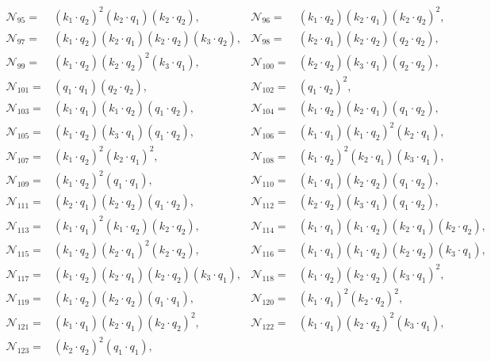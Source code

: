 \documentclass[twocolumn,aps,showpacs,nofootinbib,superscriptaddress,prd]{revtex4-2}
\begin{document}
\begin{widetext}
\begin{align}
{\mathcal N}_{95}=&(k_1\cdot q_2)^2 (k_2\cdot q_1) (k_2\cdot q_2),&
{\mathcal N}_{96}=&(k_1\cdot q_2) (k_2\cdot q_1) (k_2\cdot q_2)^2,\nonumber\\
{\mathcal N}_{97}=&(k_1\cdot q_2) (k_2\cdot q_1) (k_2\cdot q_2) (k_3\cdot q_2),&
{\mathcal N}_{98}=&(k_2\cdot q_1) (k_2\cdot q_2) (q_2\cdot q_2),\nonumber\\
{\mathcal N}_{99}=&(k_1\cdot q_2) (k_2\cdot q_2)^2 (k_3\cdot q_1),&
{\mathcal N}_{100}=&(k_2\cdot q_2) (k_3\cdot q_1) (q_2\cdot q_2),\nonumber\\
{\mathcal N}_{101}=&(q_1\cdot q_1) (q_2\cdot q_2),&
{\mathcal N}_{102}=&(q_1\cdot q_2)^2,\nonumber\\
{\mathcal N}_{103}=&(k_1\cdot q_1) (k_1\cdot q_2) (q_1\cdot q_2),&
{\mathcal N}_{104}=&(k_1\cdot q_2) (k_2\cdot q_1) (q_1\cdot q_2),\nonumber\\
{\mathcal N}_{105}=&(k_1\cdot q_2) (k_3\cdot q_1) (q_1\cdot q_2),&
{\mathcal N}_{106}=&(k_1\cdot q_1) (k_1\cdot q_2)^2 (k_2\cdot q_1),\nonumber\\
{\mathcal N}_{107}=&(k_1\cdot q_2)^2 (k_2\cdot q_1)^2,&
{\mathcal N}_{108}=&(k_1\cdot q_2)^2 (k_2\cdot q_1) (k_3\cdot q_1),\nonumber\\
{\mathcal N}_{109}=&(k_1\cdot q_2)^2 (q_1\cdot q_1),&
{\mathcal N}_{110}=&(k_1\cdot q_1) (k_2\cdot q_2) (q_1\cdot q_2),\nonumber\\
{\mathcal N}_{111}=&(k_2\cdot q_1) (k_2\cdot q_2) (q_1\cdot q_2),&
{\mathcal N}_{112}=&(k_2\cdot q_2) (k_3\cdot q_1) (q_1\cdot q_2),\nonumber\\
{\mathcal N}_{113}=&(k_1\cdot q_1)^2 (k_1\cdot q_2) (k_2\cdot q_2),&
{\mathcal N}_{114}=&(k_1\cdot q_1) (k_1\cdot q_2) (k_2\cdot q_1) (k_2\cdot q_2),\nonumber\\
{\mathcal N}_{115}=&(k_1\cdot q_2) (k_2\cdot q_1)^2 (k_2\cdot q_2),&
{\mathcal N}_{116}=&(k_1\cdot q_1) (k_1\cdot q_2) (k_2\cdot q_2) (k_3\cdot q_1),\nonumber\\
{\mathcal N}_{117}=&(k_1\cdot q_2) (k_2\cdot q_1) (k_2\cdot q_2) (k_3\cdot q_1),&
{\mathcal N}_{118}=&(k_1\cdot q_2) (k_2\cdot q_2) (k_3\cdot q_1)^2,\nonumber\\
{\mathcal N}_{119}=&(k_1\cdot q_2) (k_2\cdot q_2) (q_1\cdot q_1),&
{\mathcal N}_{120}=&(k_1\cdot q_1)^2 (k_2\cdot q_2)^2,\nonumber\\
{\mathcal N}_{121}=&(k_1\cdot q_1) (k_2\cdot q_1) (k_2\cdot q_2)^2,&
{\mathcal N}_{122}=&(k_1\cdot q_1) (k_2\cdot q_2)^2 (k_3\cdot q_1),\nonumber\\
{\mathcal N}_{123}=&(k_2\cdot q_2)^2 (q_1\cdot q_1),&

\end{align}
\end{widetext}
\end{document}
